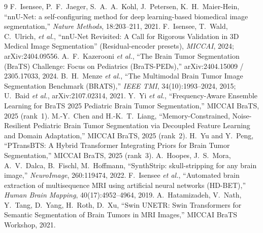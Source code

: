 \documentclass[11pt,a4paper]{article}
\begin{document}
\begin{thebibliography}{9}
\small
{} F.~Isensee, P.~F.~Jaeger, S.~A.~A.~Kohl, J.~Petersen, K.~H.~Maier-Hein,
``nnU-Net: a self-configuring method for deep learning-based biomedical image
segmentation,'' \emph{Nature Methods}, 18:203--211, 2021.
 F.~Isensee, T.~Wald, C.~Ulrich, \emph{et al.}, ``nnU-Net Revisited:
A Call for Rigorous Validation in 3D Medical Image Segmentation'' (Residual-encoder
presets), \emph{MICCAI}, 2024; arXiv:2404.09556.
 A.~F.~Kazerooni \emph{et al.}, ``The Brain Tumor Segmentation
(BraTS) Challenge: Focus on Pediatrics (BraTS-PEDs),'' arXiv:2404.15009 /
2305.17033, 2024.
 B.~H.~Menze \emph{et al.}, ``The Multimodal Brain Tumor Image
Segmentation Benchmark (BRATS),'' \emph{IEEE TMI}, 34(10):1993--2024, 2015;
U.~Baid \emph{et al.}, arXiv:2107.02314, 2021.
 Y.~Yi \emph{et al.}, ``Frequency-Aware Ensemble Learning for
BraTS 2025 Pediatric Brain Tumor Segmentation,'' MICCAI BraTS, 2025 (rank~1).
 M.-Y.~Chen and H.-K.~T.~Liang, ``Memory-Constrained,
Noise-Resilient Pediatric Brain Tumor Segmentation via Decoupled Feature Learning
and Domain Adaptation,'' MICCAI BraTS, 2025 (rank~2).
 H.~Yu and Y.~Peng, ``PTransBTS: A Hybrid Transformer Integrating
Priors for Brain Tumor Segmentation,'' MICCAI BraTS, 2025 (rank~3).
 A.~Hoopes, J.~S.~Mora, A.~V.~Dalca, B.~Fischl, M.~Hoffmann,
``SynthStrip: skull-stripping for any brain image,'' \emph{NeuroImage}, 260:119474,
2022.
 F.~Isensee \emph{et al.}, ``Automated brain extraction of
multisequence MRI using artificial neural networks (HD-BET),'' \emph{Human Brain
Mapping}, 40(17):4952--4964, 2019.
 A.~Hatamizadeh, V.~Nath, Y.~Tang, D.~Yang, H.~Roth, D.~Xu,
``Swin UNETR: Swin Transformers for Semantic Segmentation of Brain Tumors in MRI
Images,'' MICCAI BraTS Workshop, 2021.
\end{thebibliography}
\end{document}
